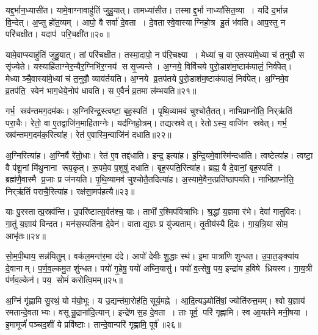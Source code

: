 यद्द॒र्भान॒ध्यासी॑त।
यामे॒वाग्नावाहु॑तिं जुहु॒यात्।
तामध्या॑सीत।
तस्माद्द॒र्भा नाध्या॑सित॒व्या।
यदि॑ द॒र्भान्न वि॒न्देत्।
अ॒प्सु हो॑त॒व्यम्।
आपो॒ वै सर्वा॑ दे॒वता।
दे॒वतास्वे॒वास्याग्निहो॒त्र हु॒तं भ॑वति।
आप॒स्तु न परि॑चक्षीत।
यदाप॑ परि॒चक्षी॑त॥२०॥

यामे॒वाप्स्वाहु॑तिं जुहु॒यात्।
तां परि॑चक्षीत।
तस्मा॒दापो॒ न प॑रि॒चक्ष्या।
मेध्या॑ च॒ वा ए॒तस्या॑मे॒ध्या च॑ त॒नुवौ॒ स सृ॑ज्येते।
यस्याहि॑ताग्नेर॒न्यैर॒ग्निभि॑र॒ग्नय॑ ससृ॒ज्यन्ते।
अ॒ग्नये॒ विवि॑चये पुरो॒डाश॑म॒ष्टाक॑पालं॒ निर्व॑पेत्।
मेध्याञ्चै॒वास्या॑मे॒ध्यां च॑ त॒नुवौ॒ व्याव॑र्तयति।
अ॒ग्नये व्र॒तप॑तये पु॒रो॒डाश॑म॒ष्टाक॑पालं॒ निर्व॑पेत्।
अ॒ग्निमे॒व व्र॒तप॑ति॒ स्वेन॑ भाग॒धेये॒नोप॑ धावति।
स ए॒वैनं॑ व्र॒तमा ल॑म्भयति॥२१॥

गर्भ॒ स्रव॑न्तमग॒दम॑कः।
अ॒ग्निरिन्द्र॒स्त्वष्टा॒ बृह॒स्पति॑।
पृ॒थि॒व्यामव॑ चुश्चोतै॒तत्।
नाभिप्राप्नो॑ति॒ निर्‌ऋ॑तिं परा॒चैः।
रेतो॒ वा ए॒तद्वाजि॑न॒माहि॑ताग्नेः।
यद॑ग्निहो॒त्रम्।
तद्यत्स्रवेत्।
रेतोऽस्य॒ वाजि॑न स्रवेत्।
गर्भ॒ स्रव॑न्तमग॒दम॑क॒रित्या॑ह।
रेत॑ ए॒वास्मि॒न्वाजि॑नं दधाति॥२२॥

अ॒ग्निरित्या॑ह।
अ॒ग्निर्वै रे॑तो॒धाः।
रेत॑ ए॒व तद्द॑धाति।
इन्द्र॒ इत्या॑ह।
इ॒न्द्रि॒यमे॒वास्मि॑न्दधाति।
त्वष्टेत्या॑ह।
त्वष्टा॒ वै प॑शू॒नां मि॑थु॒नाना रूप॒कृत्।
रू॒पमे॒व प॒शुषु॑ दधाति।
बृह॒स्पति॒रित्या॑ह।
ब्रह्म॒ वै दे॒वानां॒ बृह॒स्पति॑।
ब्रह्म॑णै॒वास्मै प्र॒जाः प्र ज॑नयति।
पृ॒थि॒व्यामव॑ चुश्चोतै॒तदित्या॑ह।
अ॒स्यामे॒वैन॒त्प्रति॑ष्ठापयति।
नाभिप्राप्नो॑ति॒ निर्‌ऋ॑तिं पराचै॒रित्या॑ह।
रक्ष॑सा॒मप॑हत्यै॥२३॥

याः पु॒रस्तात्प्र॒स्रव॑न्ति।
उ॒परि॑ष्टात्स॒र्वत॑श्च॒ याः।
ताभी॑ र॒श्मिप॑वित्राभिः।
श्र॒द्धां य॒ज्ञमा र॑भे।
देवा॑ गातुविदः।
गा॒तुं य॒ज्ञाय॑ विन्दत।
मन॑स॒स्पति॑ना दे॒वेन॑।
वाताद्य॒ज्ञः प्र यु॑ज्यताम्।
तृ॒तीय॑स्यै दि॒वः।
गा॒य॒त्रि॒या सोम॒ आभृ॑तः॥२४॥

सो॒म॒पी॒थाय॒ सन्न॑यितुम्।
वक॑ल॒मन्त॑र॒मा द॑दे।
आपो॑ देवीः शु॒द्धाः स्थ॑।
इ॒मा पात्रा॑णि शुन्धत।
उ॒पा॒त॒ङ्क्या॑य दे॒वानाम्।
प॒र्ण॒व॒ल्कमु॒त शु॑न्धत।
पयो॑ गृ॒हेषु॒ पयो॑ अघ्नि॒यासु॑।
पयो॑ व॒त्सेषु॒ पय॒ इन्द्रा॑य ह॒विषे ध्रियस्व।
गा॒य॒त्री प॑र्णव॒ल्केन॑।
पय॒ सोमं॑ करोत्वि॒मम्॥२५॥

अ॒ग्निं गृ॑ह्णामि सु॒रथं॒ यो म॑यो॒भूः।
य उ॒द्यन्त॑मा॒रोह॑ति॒ सूर्य॒मह्ने।
आ॒दि॒त्यञ्ज्योति॑षां॒ ज्योति॑रुत्त॒मम्।
श्वो य॒ज्ञाय॑ रमतान्दे॒वताभ्यः।
वसून्रु॒द्राना॑दि॒त्यान्।
इन्द्रे॑ण स॒ह दे॒वता।
ताः पूर्व॒ परि॑ गृह्णामि।
स्व आ॒यत॑ने मनी॒षया।
इ॒मामूर्जं॑ पञ्चद॒शीं ये प्रवि॑ष्टाः।
तान्दे॒वान्परि॑ गृह्णामि॒ पूर्व॑॥२६॥

